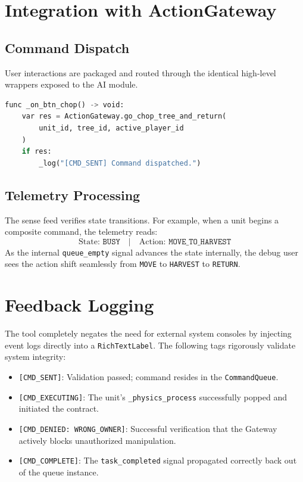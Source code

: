 \documentclass[11pt,a4paper]{article}
\begin{document}
\section{Integration with ActionGateway}

\subsection{Command Dispatch}
User interactions are packaged and routed through the identical high-level wrappers exposed to the AI module.

\begin{lstlisting}[language=Python,caption={Example: Dispatching Composite Chains}]
func _on_btn_chop() -> void:
    var res = ActionGateway.go_chop_tree_and_return(
        unit_id, tree_id, active_player_id
    )
    if res:
        _log("[CMD_SENT] Command dispatched.")
\end{lstlisting}

\subsection{Telemetry Processing}
The sense feed verifies state transitions. For example, when a unit begins a composite command, the telemetry reads:
$$
\text{State: } \texttt{BUSY} \quad | \quad \text{Action: } \texttt{MOVE\_TO\_HARVEST}
$$
As the internal \texttt{queue\_empty} signal advances the state internally, the debug user sees the action shift seamlessly from \texttt{MOVE} to \texttt{HARVEST} to \texttt{RETURN}.

\section{Feedback Logging}

The tool completely negates the need for external system consoles by injecting event logs directly into a \texttt{RichTextLabel}. The following tags rigorously validate system integrity:

\begin{itemize}
    \item \texttt{[CMD\_SENT]}: Validation passed; command resides in the \texttt{CommandQueue}.
    \item \texttt{[CMD\_EXECUTING]}: The unit's \texttt{\_physics\_process} successfully popped and initiated the contract.
    \item \texttt{[CMD\_DENIED: WRONG\_OWNER]}: Successful verification that the Gateway actively blocks unauthorized manipulation.
    \item \texttt{[CMD\_COMPLETE]}: The \texttt{task\_completed} signal propagated correctly back out of the queue instance.
\end{itemize}
\end{document}
